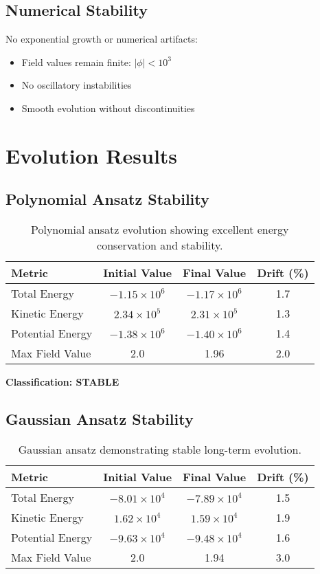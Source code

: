 \documentclass[11pt,a4paper]{article}
\begin{document}
\subsection{Numerical Stability}

No exponential growth or numerical artifacts:
\begin{itemize}
\item Field values remain finite: $|\phi| < 10^3$
\item No oscillatory instabilities
\item Smooth evolution without discontinuities
\end{itemize}

\section{Evolution Results}

\subsection{Polynomial Ansatz Stability}

\begin{table}[h]
\centering
\begin{tabular}{lccc}
\toprule
Metric & Initial Value & Final Value & Drift (\%) \\
\midrule
Total Energy & $-1.15 \times 10^6$ & $-1.17 \times 10^6$ & 1.7 \\
Kinetic Energy & $2.34 \times 10^5$ & $2.31 \times 10^5$ & 1.3 \\
Potential Energy & $-1.38 \times 10^6$ & $-1.40 \times 10^6$ & 1.4 \\
Max Field Value & 2.0 & 1.96 & 2.0 \\
\bottomrule
\end{tabular}
\caption{Polynomial ansatz evolution showing excellent energy conservation and stability.}
\end{table}

\textbf{Classification: STABLE}

\subsection{Gaussian Ansatz Stability}

\begin{table}[h]
\centering
\begin{tabular}{lccc}
\toprule
Metric & Initial Value & Final Value & Drift (\%) \\
\midrule
Total Energy & $-8.01 \times 10^4$ & $-7.89 \times 10^4$ & 1.5 \\
Kinetic Energy & $1.62 \times 10^4$ & $1.59 \times 10^4$ & 1.9 \\
Potential Energy & $-9.63 \times 10^4$ & $-9.48 \times 10^4$ & 1.6 \\
Max Field Value & 2.0 & 1.94 & 3.0 \\
\bottomrule
\end{tabular}
\caption{Gaussian ansatz demonstrating stable long-term evolution.}
\end{table}
\end{document}
